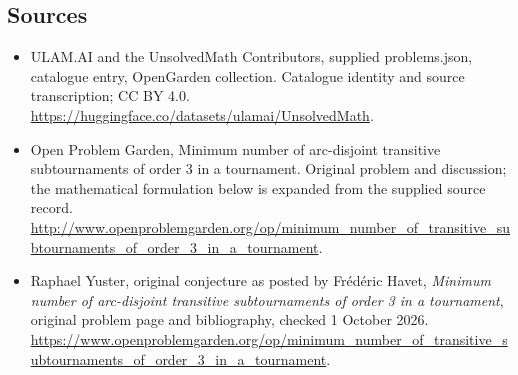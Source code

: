 \documentclass[11pt,a4paper]{article}
\begin{document}
\subsection{Sources}
\begin{itemize}
\item[S1] ULAM.AI and the UnsolvedMath Contributors, supplied problems.json, catalogue entry, OpenGarden collection. Catalogue identity and source transcription; CC BY 4.0.
\url{https://huggingface.co/datasets/ulamai/UnsolvedMath}.
\item[S2] Open Problem Garden, Minimum number of arc-disjoint transitive subtournaments of order 3 in a tournament. Original problem and discussion; the mathematical formulation below is expanded from the supplied source record.
\url{http://www.openproblemgarden.org/op/minimum_number_of_transitive_subtournaments_of_order_3_in_a_tournament}.

\item[R1] Raphael Yuster, original conjecture as posted by Fr\'ed\'eric
Havet, \emph{Minimum number of arc-disjoint transitive subtournaments
of order 3 in a tournament}, original problem page and bibliography,
checked 1 October 2026.
\url{https://www.openproblemgarden.org/op/minimum_number_of_transitive_subtournaments_of_order_3_in_a_tournament}.

\end{itemize}
\end{document}
